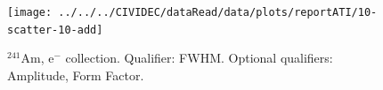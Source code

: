 %
%
%
%
%
%


\clearpage
\begin{figure}[!t]
\centering
\texttt{[image: ../../../CIVIDEC/dataRead/data/plots/reportATI/10-scatter-10-add]}
\caption{$^{241}$Am, e$^{-}$ collection. Qualifier: FWHM. Optional qualifiers: Amplitude, Form Factor.}
\label{fig:scatterae}
\end{figure}


\clearpage
